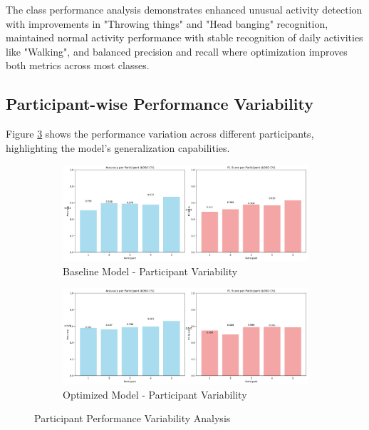 \documentclass{iopconfser}
\begin{document}
The class performance analysis demonstrates enhanced unusual activity detection with improvements in "Throwing things" and "Head banging" recognition, maintained normal activity performance with stable recognition of daily activities like "Walking", and balanced precision and recall where optimization improves both metrics across most classes.

\subsection{Participant-wise Performance Variability}

Figure \ref{fig:participant_performance} shows the performance variation across different participants, highlighting the model's generalization capabilities.

\begin{figure}[H]
\centering
\begin{subfigure}{0.48\textwidth}
    \centering
    \includegraphics[width=\textwidth]{results/metrics/baseline/participant_performance.png}
    \caption{Baseline Model - Participant Variability}
    \label{fig:baseline_participants}
\end{subfigure}
\hfill
\begin{subfigure}{0.48\textwidth}
    \centering
    \includegraphics[width=\textwidth]{results/metrics/optimized/participant_performance.png}
    \caption{Optimized Model - Participant Variability}
    \label{fig:optimized_participants}
\end{subfigure}
\caption{Participant Performance Variability Analysis}
\label{fig:participant_performance}
\end{figure}
\end{document}
